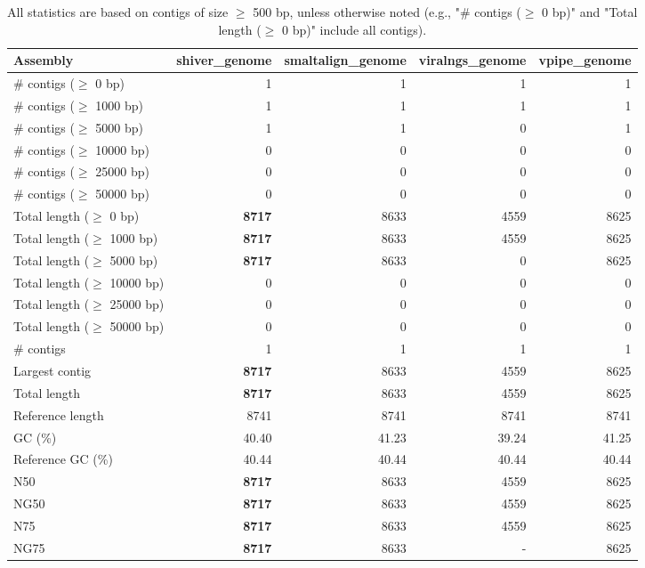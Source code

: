 \documentclass[12pt,a4paper]{article}
\begin{document}
\begin{table}[ht]
\begin{center}
\caption{All statistics are based on contigs of size $\geq$ 500 bp, unless otherwise noted (e.g., "\# contigs ($\geq$ 0 bp)" and "Total length ($\geq$ 0 bp)" include all contigs).}
\begin{tabular}{|l*{4}{|r}|}
\hline
Assembly & shiver\_genome & smaltalign\_genome & viralngs\_genome & vpipe\_genome \\ \hline
\# contigs ($\geq$ 0 bp) & 1 & 1 & 1 & 1 \\ \hline
\# contigs ($\geq$ 1000 bp) & 1 & 1 & 1 & 1 \\ \hline
\# contigs ($\geq$ 5000 bp) & 1 & 1 & 0 & 1 \\ \hline
\# contigs ($\geq$ 10000 bp) & 0 & 0 & 0 & 0 \\ \hline
\# contigs ($\geq$ 25000 bp) & 0 & 0 & 0 & 0 \\ \hline
\# contigs ($\geq$ 50000 bp) & 0 & 0 & 0 & 0 \\ \hline
Total length ($\geq$ 0 bp) & {\bf 8717} & 8633 & 4559 & 8625 \\ \hline
Total length ($\geq$ 1000 bp) & {\bf 8717} & 8633 & 4559 & 8625 \\ \hline
Total length ($\geq$ 5000 bp) & {\bf 8717} & 8633 & 0 & 8625 \\ \hline
Total length ($\geq$ 10000 bp) & 0 & 0 & 0 & 0 \\ \hline
Total length ($\geq$ 25000 bp) & 0 & 0 & 0 & 0 \\ \hline
Total length ($\geq$ 50000 bp) & 0 & 0 & 0 & 0 \\ \hline
\# contigs & 1 & 1 & 1 & 1 \\ \hline
Largest contig & {\bf 8717} & 8633 & 4559 & 8625 \\ \hline
Total length & {\bf 8717} & 8633 & 4559 & 8625 \\ \hline
Reference length & 8741 & 8741 & 8741 & 8741 \\ \hline
GC (\%) & 40.40 & 41.23 & 39.24 & 41.25 \\ \hline
Reference GC (\%) & 40.44 & 40.44 & 40.44 & 40.44 \\ \hline
N50 & {\bf 8717} & 8633 & 4559 & 8625 \\ \hline
NG50 & {\bf 8717} & 8633 & 4559 & 8625 \\ \hline
N75 & {\bf 8717} & 8633 & 4559 & 8625 \\ \hline
NG75 & {\bf 8717} & 8633 & - & 8625 \\ \hline

\end{tabular}
\end{center}
\end{table}
\end{document}
